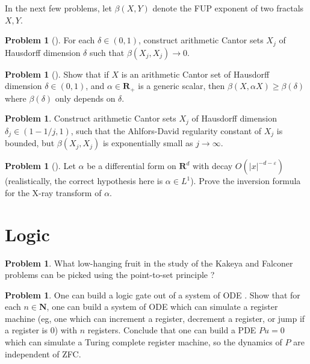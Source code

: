 \documentclass[reqno,11pt]{amsart}
\newcommand{\NN}{\mathbf{N}}
\newcommand{\RR}{\mathbf{R}}
\theoremstyle{definition}
\newtheorem{problem}[theorem]{Problem}
\numberwithin{equation}{section}
\begin{document}
In the next few problems, let $\beta(X, Y)$ denote the FUP exponent of two fractals $X, Y$.

\begin{problem}[{\cite[Conjecture 4.4]{Dyatlov_2019}}]
For each $\delta \in (0, 1)$, construct arithmetic Cantor sets $X_j$ of Hausdorff dimension $\delta$ such that $\beta(X_j, X_j) \to 0$.
\end{problem}

\begin{problem}[{\cite[Conjecture 4.5]{Dyatlov_2019}}]
Show that if $X$ is an arithmetic Cantor set of Hausdorff dimension $\delta \in (0, 1)$, and $\alpha \in \RR_+$ is a generic scalar, then $\beta(X, \alpha X) \geq \beta(\delta)$ where $\beta(\delta)$ only depends on $\delta$.
\end{problem}

\begin{problem}
Construct arithmetic Cantor sets $X_j$ of Hausdorff dimension $\delta_j \in (1 - 1/j, 1)$, such that the Ahlfors-David regularity constant of $X_j$ is bounded, but $\beta(X_j, X_j)$ is exponentially small as $j \to \infty$.
\end{problem}

\begin{problem}[{\cite{Solomon11}}]
Let $\alpha$ be a differential form on $\RR^d$ with decay $O(|x|^{-d-\varepsilon})$ (realistically, the correct hypothesis here is $\alpha \in L^1$).
Prove the inversion formula for the X-ray transform of $\alpha$.
\end{problem}


\section{Logic}
\begin{problem}
What low-hanging fruit in the study of the Kakeya and Falconer problems can be picked using the point-to-set principle \cite{Lutz18}?
\end{problem}

\begin{problem}
One can build a logic gate out of a system of ODE \cite{Tao16}.
Show that for each $n \in \NN$, one can build a system of ODE which can simulate a register machine (eg, one which can increment a register, decrement a register, or jump if a register is $0$) with $n$ registers.
Conclude that one can build a PDE $Pu = 0$ which can simulate a Turing complete register machine, so the dynamics of $P$ are independent of ZFC.
\end{problem}



\printbibliography
\end{document}
